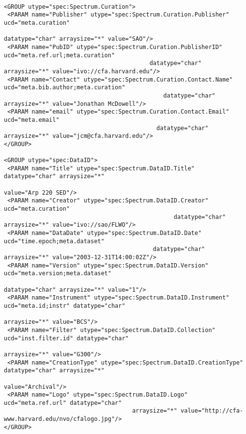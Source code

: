 {\begin{flushleft}
\begin{fmpage}
\begin{verbatim}
\end{verbatim}
\end{fmpage}

\begin{fmpage}
\begin{verbatim}

<GROUP utype="spec:Spectrum.Curation">
 <PARAM name="Publisher" utype="spec:Spectrum.Curation.Publisher" ucd="meta.curation" 
                                                            datatype="char" arraysize="*" value="SAO"/>
 <PARAM name="PubID" utype="spec:Spectrum.Curation.PublisherID" ucd="meta.ref.url;meta.curation"
                                          datatype="char" arraysize="*" value="ivo://cfa.harvard.edu"/>
 <PARAM name="Contact" utype="spec:Spectrum.Curation.Contact.Name" ucd="meta.bib.author;meta.curation" 
                                              datatype="char" arraysize="*" value="Jonathan McDowell"/>
 <PARAM name="email" utype="spec:Spectrum.Curation.Contact.Email" ucd="meta.email" 
                                            datatype="char" arraysize="*" value="jcm@cfa.harvard.edu"/>
</GROUP>

<GROUP utype="spec:DataID">
 <PARAM name="Title" utype="spec:Spectrum.DataID.Title" datatype="char" arraysize="*"
                                                                                  value="Arp 220 SED"/>
 <PARAM name="Creator" utype="spec:Spectrum.DataID.Creator" ucd="meta.curation" 
                                                 datatype="char" arraysize="*" value="ivo://sao/FLWO"/>
 <PARAM name="DataDate" utype="spec:Spectrum.DataID.Date" ucd="time.epoch;meta.dataset"
                                           datatype="char" arraysize="*" value="2003-12-31T14:00:02Z"/>
 <PARAM name="Version" utype="spec:Spectrum.DataID.Version" ucd="meta.version;meta.dataset"
                                                              datatype="char" arraysize="*" value="1"/>
 <PARAM name="Instrument" utype="spec:Spectrum.DataID.Instrument" ucd="meta.id;instr" datatype="char" 
                                                                            arraysize="*" value="BCS"/>
 <PARAM name="Filter" utype="spec:Spectrum.DataID.Collection" ucd="inst.filter.id" datatype="char" 
                                                                           arraysize="*" value="G300"/>
 <PARAM name="CreationType" utype="spec:Spectrum.DataID.CreationType" datatype="char" arraysize="*" 
                                                                                     value="Archival"/>
 <PARAM name="Logo" utype="spec:Spectrum.DataID.Logo" ucd="meta.ref.url" datatype="char" 
                                     arraysize="*" value="http://cfa-www.harvard.edu/nvo/cfalogo.jpg"/>
</GROUP>


\end{verbatim}
\end{fmpage}
\end{flushleft}}
